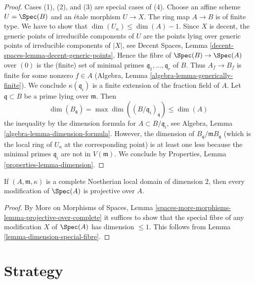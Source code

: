 \begin{proof}
Cases (1), (2), and (3) are special cases of (4). Choose an affine scheme
$U = \Spec(B)$ and an \'etale morphism $U \to X$. The ring map $A \to B$
is of finite type. We have to show that
$\dim(U_\kappa) \leq \dim(A) - 1$. Since $X$ is decent, the generic
points of irreducible components of $U$ are the points lying over
generic points of irreducible components of $|X|$, see
Decent Spaces, Lemma \ref{decent-spaces-lemma-decent-generic-points}.
Hence the fibre of $\Spec(B) \to \Spec(A)$ over $(0)$
is the (finite) set of minimal primes $\mathfrak q_1, \ldots, \mathfrak q_r$
of $B$. Thus $A_f \to B_f$ is finite for some nonzero $f \in A$
(Algebra, Lemma \ref{algebra-lemma-generically-finite}).
We conclude $\kappa(\mathfrak q_i)$ is a finite extension of the
fraction field of $A$.
Let $\mathfrak q \subset B$ be a prime lying over $\mathfrak m$. Then
$$
\dim(B_\mathfrak q) = \max \dim((B/\mathfrak q_i)_{\mathfrak q})
\leq \dim(A)
$$
the inequality by the dimension formula for $A \subset B/\mathfrak q_i$, see
Algebra, Lemma \ref{algebra-lemma-dimension-formula}.
However, the dimension of $B_\mathfrak q/\mathfrak m B_\mathfrak q$
(which is the local ring of $U_\kappa$ at the corresponding point)
is at least one less because the minimal primes $\mathfrak q_i$
are not in $V(\mathfrak m)$. We conclude by
Properties, Lemma \ref{properties-lemma-dimension}.
\end{proof}

\begin{lemma}
\label{lemma-modification-of-dim-2-is-projective-over-complete}
If $(A, \mathfrak m, \kappa)$ is a complete Noetherian local domain
of dimension $2$, then every modification of $\Spec(A)$ is projective over $A$.
\end{lemma}

\begin{proof}
By More on Morphisms of Spaces, Lemma
\ref{spaces-more-morphisms-lemma-projective-over-complete}
it suffices to show that the special fibre of any modification
$X$ of $\Spec(A)$ has dimension $\leq 1$.
This follows from Lemma \ref{lemma-dimension-special-fibre}.
\end{proof}






\section{Strategy}
\label{section-strategy}

